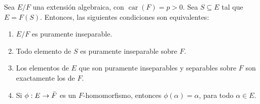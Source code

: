 \documentclass[12pt]{report}
\theoremstyle{largebreak}
\DeclareMathOperator{\car}{car}
\begin{document}
    \begin{propo}
        Sea $E/F$ una extensión algebraica, con $\car(F)=p>0$. Sea $S\subseteq E$ tal que $E=F(S)$. Entonces, las siguientes condiciones son equivalentes:
        
        \begin{enumerate}
            \item $E/F$ es puramente inseparable.
            \item Todo elemento de $S$ es puramente inseparable sobre $F$.
            \item Los elementos de $E$ que son puramente inseparables y separables sobre $F$ son exactamente los de $F$.
            \item Si $\phi:E\rightarrow \Bar{F}$ es un $F$-homomorfismo, entonces $\phi(\alpha)=\alpha$, para todo $\alpha\in E$.
        \end{enumerate}
    \end{propo}
\end{document}
